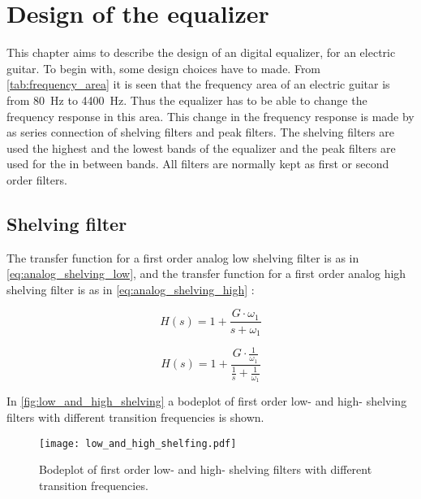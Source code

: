 \section{Design of the equalizer}
This chapter aims to describe the design of an digital equalizer, for an electric guitar. 
To begin with, some design choices have to made. From \autoref{tab:frequency_area} it is seen that the frequency area of an electric guitar is from \SI{80}{\hertz} to \SI{4400}{\hertz}. Thus the equalizer has to be able to change the frequency response in this area. This change in the frequency response is made by as series connection of shelving filters and peak filters. The shelving filters are used the highest and the lowest bands of the equalizer and the peak filters are used for the in between bands. All filters are normally kept as first or second order filters. 

\subsection{Shelving filter}
The transfer function for a first order analog low shelving filter is as in \autoref{eq:analog_shelving_low}, and the transfer function for a first order analog high shelving filter is as in \autoref{eq:analog_shelving_high} \citep{Julius_smith}:

\begin{equation}\label{eq:analog_shelving_low}
        H(s) = 1+\frac{G\cdot\omega_1}{s+\omega_1}
    \end{equation}

    \startexplain
    \stopexplain

\begin{equation}\label{eq:analog_shelving_high}
        H(s) = 1+\frac{G\cdot\frac{1}{\omega_1}}{\frac{1}{s}+\frac{1}{\omega_1}}
    \end{equation}
    
In \autoref{fig:low_and_high_shelving} a bodeplot of first order low- and high- shelving filters with different transition frequencies is shown.

\begin{figure}
    \centering
        \texttt{[image: low\_and\_high\_shelfing.pdf]}
        \caption{Bodeplot of first order low- and high- shelving filters with different transition frequencies.}
        \label{fig:low_and_high_shelving}
  \end{figure} 


